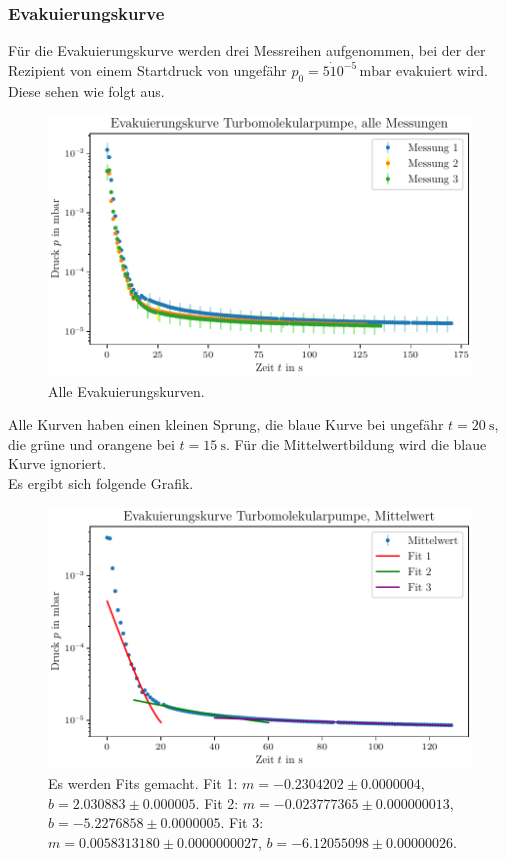 \subsubsection{Evakuierungskurve}
Für die Evakuierungskurve werden drei Messreihen aufgenommen, bei der der Rezipient von einem Startdruck von ungefähr $p_0 = \num{5} \dot 10^{-5} \, \si{\milli\bar}$ evakuiert wird.
Diese sehen wie folgt aus.

\begin{figure}[H]
    \centering
    \includegraphics[width=\textwidth]{plots/TP_Evakuierungskurve_alle.pdf}
    \caption{Alle Evakuierungskurven.}
    \label{fig:TP_evak_alle}
\end{figure}

Alle Kurven haben einen kleinen Sprung, die blaue Kurve bei ungefähr $t = \SI{20}{\second}$, die grüne und orangene bei $t = \SI{15}{\second}$.
Für die Mittelwertbildung wird die blaue Kurve ignoriert. \\
Es ergibt sich folgende Grafik.

\begin{figure}[H]
    \centering
    \includegraphics[width=\textwidth]{plots/TP_Evakuierungskurve.pdf}
    \caption{Es werden Fits gemacht. Fit 1: $m = \num{-0.2304202} \pm \num{0.0000004}$, $b = \num{2.030883} \pm \num{0.000005}$. Fit 2: $m = \num{-0.023777365} \pm \num{0.000000013}$, $b = \num{-5.2276858} \pm \num{0.0000005}$. Fit 3: $m = \num{0.0058313180} \pm \num{0.0000000027}$, $b = \num{-6.12055098} \pm \num{0.00000026}$.}
    \label{fig:TP_evak}
\end{figure}

